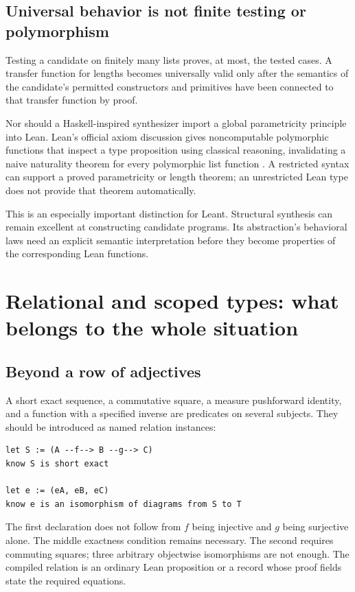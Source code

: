 \documentclass[11pt,a4paper]{article}
\theoremstyle{plain}
\theoremstyle{definition}
\theoremstyle{remark}
\begin{document}
\subsection{Universal behavior is not finite testing or polymorphism}
Testing a candidate on finitely many lists proves, at most, the tested cases.
A transfer function for lengths becomes universally valid only after the
semantics of the candidate's permitted constructors and primitives have been
connected to that transfer function by proof.

Nor should a Haskell-inspired synthesizer import a global parametricity
principle into Lean. Lean's official axiom discussion gives noncomputable
polymorphic functions that inspect a type proposition using classical
reasoning, invalidating a naive naturality theorem for every polymorphic
list function \cite{leanaxioms}. A restricted syntax can support a proved
parametricity or length theorem; an unrestricted Lean type does not provide
that theorem automatically.

This is an especially important distinction for Leant. Structural synthesis
can remain excellent at constructing candidate programs. Its abstraction's
behavioral laws need an explicit semantic interpretation before they become
properties of the corresponding Lean functions.

\section{Relational and scoped types: what belongs to the whole situation}
\label{sec:relations}
\subsection{Beyond a row of adjectives}
A short exact sequence, a commutative square, a measure pushforward identity,
and a function with a specified inverse are predicates on several subjects.
They should be introduced as named relation instances:
\par\noindent\begin{minipage}{\linewidth}
\begin{lstlisting}
let S := (A --f--> B --g--> C)
know S is short exact

let e := (eA, eB, eC)
know e is an isomorphism of diagrams from S to T
\end{lstlisting}
\end{minipage}\par

The first declaration does not follow from $f$ being injective and $g$ being
surjective alone. The middle exactness condition remains necessary. The second
requires commuting squares; three arbitrary objectwise isomorphisms are not
enough. The compiled relation is an ordinary Lean proposition or a record
whose proof fields state the required equations.
\end{document}
